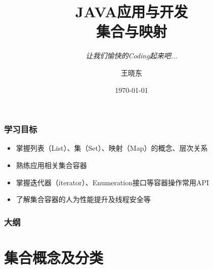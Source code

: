 
\title{\hei JAVA应用与开发\\  集合与映射}
\subtitle{\it 让我们愉快的Coding起来吧...}
\author{王晓东}
\date{\today}


\begin{frame}
  \maketitle
\end{frame}

\begin{frame}
  \frametitle{学习目标}
  \begin{itemize}
  \item 掌握列表（List）、集（Set）、映射（Map）的概念、层次关系
  \item 熟练应用相关集合容器
  \item 掌握迭代器（iterator）、Enumeration接口等容器操作常用API
  \item 了解集合容器的人为性能提升及线程安全等
  \end{itemize}
\end{frame}

\begin{frame}
  \frametitle{大纲}
  \tableofcontents
\end{frame}

\section{集合概念及分类}


